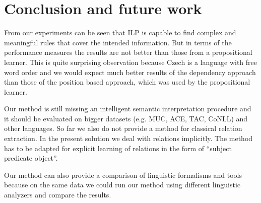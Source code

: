 \documentclass[runningheads,a4paper]{llncs}
\begin{document}










\section{Conclusion and future work}
From our experiments can be seen that ILP is capable to find complex and meaningful rules that cover the intended information. But in terms of the performance measures the results are not better than those from a propositional learner. This is quite surprising observation because Czech is a language with free word order and we would expect much better results of the dependency approach than those of the position based approach, which was used by the propositional learner.

Our method is still missing an intelligent semantic interpretation procedure and it should be evaluated on bigger datasets (e.g. MUC, ACE, TAC, CoNLL) and other languages. So far we also do not provide a method for classical relation extraction. In the present solution we deal with relations implicitly. The method has to be adapted for explicit learning of relations in the form of ``subject predicate object''.

Our method can also provide a comparison of linguistic formalisms and tools because on the same data we could run our method using different linguistic analyzers and compare the results.








\end{document}
